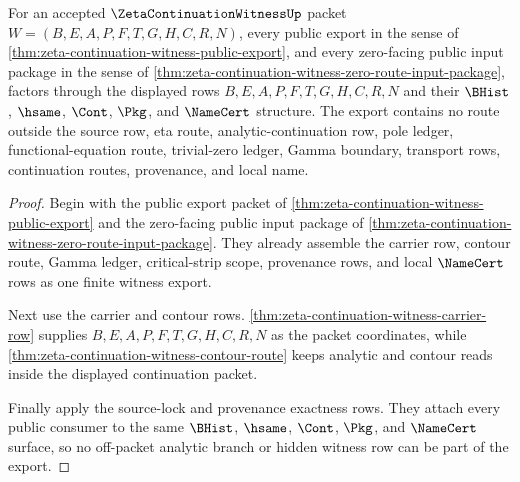\begin{theorem}
\label{thm:zeta-continuation-witness-public-export-factorization}
For an accepted $\ZetaContinuationWitnessUp$ packet $W=(B,E,A,P,F,T,G,H,C,R,N)$, every public export in the sense of \autoref{thm:zeta-continuation-witness-public-export}, and every zero-facing public input package in the sense of \autoref{thm:zeta-continuation-witness-zero-route-input-package}, factors through the displayed rows $B,E,A,P,F,T,G,H,C,R,N$ and their $\BHist$, $\hsame$, $\Cont$, $\Pkg$, and $\NameCert$ structure. The export contains no route outside the source row, eta route, analytic-continuation row, pole ledger, functional-equation route, trivial-zero ledger, Gamma boundary, transport rows, continuation routes, provenance, and local name.
\end{theorem}
\begin{proof}
Begin with the public export packet of \autoref{thm:zeta-continuation-witness-public-export} and the zero-facing public input package of \autoref{thm:zeta-continuation-witness-zero-route-input-package}. They already assemble the carrier row, contour route, Gamma ledger, critical-strip scope, provenance rows, and local $\NameCert$ rows as one finite witness export.

Next use the carrier and contour rows. \autoref{thm:zeta-continuation-witness-carrier-row} supplies $B,E,A,P,F,T,G,H,C,R,N$ as the packet coordinates, while \autoref{thm:zeta-continuation-witness-contour-route} keeps analytic and contour reads inside the displayed continuation packet.

Finally apply the source-lock and provenance exactness rows. They attach every public consumer to the same $\BHist$, $\hsame$, $\Cont$, $\Pkg$, and $\NameCert$ surface, so no off-packet analytic branch or hidden witness row can be part of the export.
\end{proof}

